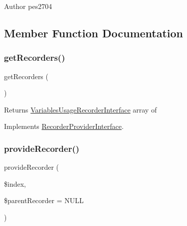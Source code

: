 \begin{DoxyAuthor}{Author}
pes2704 
\end{DoxyAuthor}


\subsection{Member Function Documentation}
\mbox{\label{class_pes_1_1_view_1_1_recorder_1_1_recorder_provider_ad8b2b29a9520c160fd7b09907bd01e27}} 
\subsubsection{\texorpdfstring{get\+Recorders()}{getRecorders()}}
{\footnotesize\ttfamily get\+Recorders (\begin{DoxyParamCaption}{ }\end{DoxyParamCaption})}

\begin{DoxyReturn}{Returns}
\mbox{\hyperlink{interface_pes_1_1_view_1_1_recorder_1_1_variables_usage_recorder_interface}{Variables\+Usage\+Recorder\+Interface}} array of 
\end{DoxyReturn}


Implements \mbox{\hyperlink{interface_pes_1_1_view_1_1_recorder_1_1_recorder_provider_interface_ad8b2b29a9520c160fd7b09907bd01e27}{Recorder\+Provider\+Interface}}.

\mbox{\label{class_pes_1_1_view_1_1_recorder_1_1_recorder_provider_a3a845b7c3190054b0443ad6d53022756}} 
\subsubsection{\texorpdfstring{provide\+Recorder()}{provideRecorder()}}
{\footnotesize\ttfamily provide\+Recorder (\begin{DoxyParamCaption}\item[{}]{\$index,  }\item[{\mbox{\hyperlink{interface_pes_1_1_view_1_1_recorder_1_1_variables_usage_recorder_interface}{Variables\+Usage\+Recorder\+Interface}}}]{\$parent\+Recorder = {\ttfamily NULL} }\end{DoxyParamCaption})}

